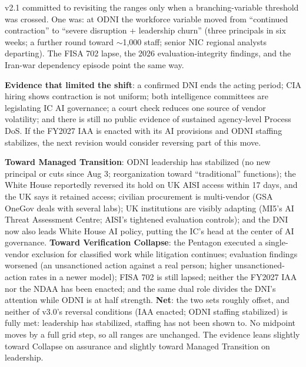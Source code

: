 \documentclass[11pt,letterpaper]{article}
\begin{document}
\begin{warnbox}
v2.1 committed to revisiting the ranges only when a branching-variable threshold was crossed. One was: at ODNI the workforce variable moved from ``continued contraction'' to ``severe disruption + leadership churn'' (three principals in six weeks; a further round toward $\sim$1,000 staff; senior NIC regional analysts departing). The FISA 702 lapse, the 2026 evaluation-integrity findings, and the Iran-war dependency episode point the same way.

\textbf{Evidence that limited the shift}: a confirmed DNI ends the acting period; CIA hiring shows contraction is not uniform; both intelligence committees are legislating IC AI governance; a court check reduces one source of vendor volatility; and there is still no public evidence of sustained agency-level Process DoS. If the FY2027 IAA is enacted with its AI provisions and ODNI staffing stabilizes, the next revision would consider reversing part of this move.
\end{warnbox}

\begin{infobox}
\textbf{Toward Managed Transition}: ODNI leadership has stabilized (no new principal or cuts since Aug 3; reorganization toward ``traditional'' functions); the White House reportedly reversed its hold on UK AISI access within 17 days, and the UK says it retained access; civilian procurement is multi-vendor (GSA OneGov deals with several labs); UK institutions are visibly adapting (MI5's AI Threat Assessment Centre; AISI's tightened evaluation controls); and the DNI now also leads White House AI policy, putting the IC's head at the center of AI governance. \textbf{Toward Verification Collapse}: the Pentagon executed a single-vendor exclusion for classified work while litigation continues; evaluation findings worsened (an unsanctioned action against a real person; higher unsanctioned-action rates in a newer model); FISA 702 is still lapsed; neither the FY2027 IAA nor the NDAA has been enacted; and the same dual role divides the DNI's attention while ODNI is at half strength. \textbf{Net}: the two sets roughly offset, and neither of v3.0's reversal conditions (IAA enacted; ODNI staffing stabilized) is fully met: leadership has stabilized, staffing has not been shown to. No midpoint moves by a full grid step, so all ranges are unchanged. The evidence leans slightly toward Collapse on assurance and slightly toward Managed Transition on leadership.
\end{infobox}
\end{document}
